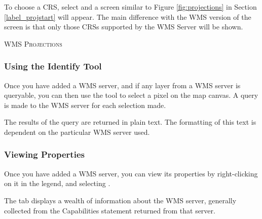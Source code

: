 To choose a CRS, select  and a screen similar to
Figure \ref{fig:projections} in Section \ref{label_projstart} will appear.
The main difference with the WMS version of the screen is that only
those CRSs supported by the WMS Server will be shown.


\begin{Tip}[ht]\caption{\textsc{WMS Projections}}
\end{Tip}


\subsubsection{Using the Identify Tool}\label{sec:ogc-wms-identify}

Once you have added a WMS server, 
and if any layer from a WMS server is queryable, you can then use
the  tool to select a pixel on the map canvas.
A query is made to the WMS server for each selection made.

The results of the query are returned in plain text.
The formatting of this text is dependent on the particular
WMS server used.


\subsubsection{Viewing Properties}\label{sec:ogc-wms-properties}

Once you have added a WMS server, you can view its properties
by right-clicking on it in the legend, and selecting
.


\label{sec:ogc-wms-properties-metadata}

The  tab displays a wealth of information about the WMS server,
generally collected from the Capabilities statement returned from
that server.

